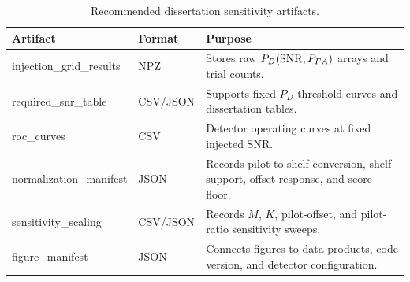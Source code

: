 \begin{table}[ht]
\centering
\caption{Recommended dissertation sensitivity artifacts.}
\label{tab:sensitivity-artifacts}
\begin{tabularx}{\textwidth}{l l Y}
\toprule
Artifact & Format & Purpose \\
\midrule
injection\_grid\_results & NPZ & Stores raw $P_D({\rm SNR},P_{FA})$ arrays and trial counts. \\
required\_snr\_table & CSV/JSON & Supports fixed-$P_D$ threshold curves and dissertation tables. \\
roc\_curves & CSV & Detector operating curves at fixed injected SNR. \\
normalization\_manifest & JSON & Records pilot-to-shelf conversion, shelf support, offset response, and score floor. \\
sensitivity\_scaling & CSV/JSON & Records $M$, $K$, pilot-offset, and pilot-ratio sensitivity sweeps. \\
figure\_manifest & JSON & Connects figures to data products, code version, and detector configuration. \\
\bottomrule
\end{tabularx}
\end{table}